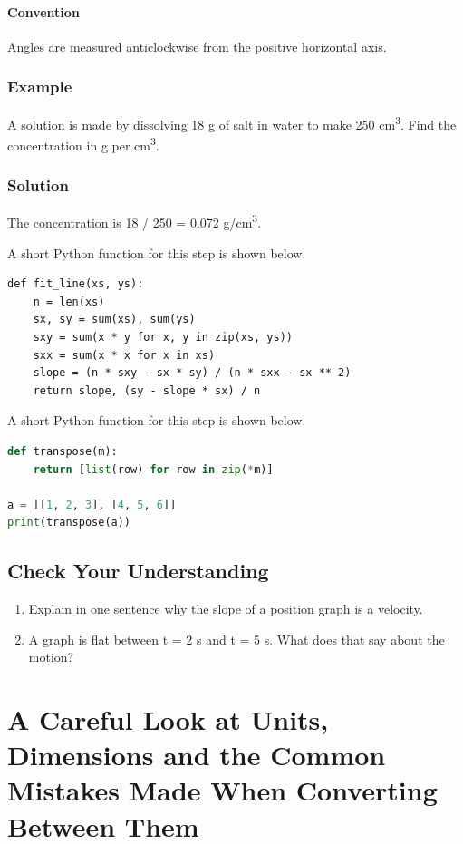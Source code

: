 \documentclass[11pt]{article}
\begin{document}
\paragraph{Convention} Angles are measured anticlockwise from the positive horizontal axis.

\subsubsection*{Example}

A solution is made by dissolving 18 g of salt in water to make 250 cm\textsuperscript{3}. Find the concentration in g per cm\textsuperscript{3}.

\subsubsection*{Solution}

The concentration is 18 / 250 = 0.072 g/cm\textsuperscript{3}.

A short Python function for this step is shown below.

{\small\begin{verbatim}
def fit_line(xs, ys):
    n = len(xs)
    sx, sy = sum(xs), sum(ys)
    sxy = sum(x * y for x, y in zip(xs, ys))
    sxx = sum(x * x for x in xs)
    slope = (n * sxy - sx * sy) / (n * sxx - sx ** 2)
    return slope, (sy - slope * sx) / n
\end{verbatim}}

A short Python function for this step is shown below.

\begin{lstlisting}[language=Python]
def transpose(m):
    return [list(row) for row in zip(*m)]

a = [[1, 2, 3], [4, 5, 6]]
print(transpose(a))
\end{lstlisting}

\subsection*{Check Your Understanding}
\begin{enumerate}
\item Explain in one sentence why the slope of a position graph is a velocity.
\item A graph is flat between t = 2 s and t = 5 s. What does that say about the motion?
\end{enumerate}

\section{A Careful Look at Units, Dimensions and the Common Mistakes Made When Converting Between Them}
\end{document}
